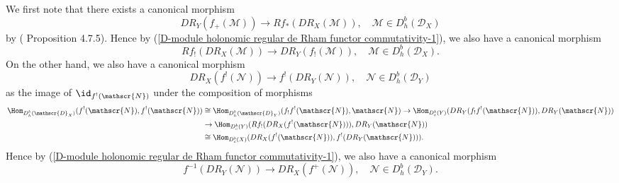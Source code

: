 We first note that there exists a canonical morphism
\begin{equation}\label{D-module holonomic regular de Rham functor commutativity-2}
DR_Y(f_+(\mathscr{M}))\to Rf_*(DR_X(\mathscr{M})),\quad \mathscr{M}\in D^b_h(\mathscr{D}_X)
\end{equation}
by (\cite{Hotta} Proposition 4.7.5). Hence by (\ref{D-module holonomic regular de Rham functor commutativity-1}), we also have a canonical morphism
\begin{equation}\label{D-module holonomic regular de Rham functor commutativity-3}
Rf_!(DR_X(\mathscr{M}))\to DR_Y(f_!(\mathscr{M})),\quad \mathscr{M}\in D^b_h(\mathscr{D}_X).
\end{equation}
On the other hand, we also have a canonical morphism
\begin{equation}\label{D-module holonomic regular de Rham functor commutativity-4}
DR_X(f^!(\mathscr{N}))\to f^!(DR_Y(\mathscr{N})),\quad \mathscr{N}\in D^b_h(\mathscr{D}_Y)
\end{equation}
as the image of $\id_{f^!(\mathscr{N})}$ under the composition of morphisms
\begin{align*}
\Hom_{D^b_h(\mathscr{D}_X)}(f^!(\mathscr{N}),f^!(\mathscr{N}))&\cong\Hom_{D^b_h(\mathscr{D}_Y)}(f_!f^!(\mathscr{N}),\mathscr{N})\to \Hom_{D^b_c(Y)}(DR_Y(f_!f^!(\mathscr{N})),DR_Y(\mathscr{N}))\\
&\to \Hom_{D^b_c(Y)}(Rf_!(DR_X(f^!(\mathscr{N}))),DR_Y(\mathscr{N}))\\
&\cong\Hom_{D^b_c(X)}(DR_X(f^!(\mathscr{N})),f^!(DR_Y(\mathscr{N}))).
\end{align*}
Hence by (\ref{D-module holonomic regular de Rham functor commutativity-1}), we also have a canonical morphism
\begin{equation}\label{D-module holonomic regular de Rham functor commutativity-5}
f^{-1}(DR_Y(\mathscr{N}))\to DR_X(f^+(\mathscr{N})),\quad \mathscr{N}\in D^b_h(\mathscr{D}_Y).
\end{equation}

